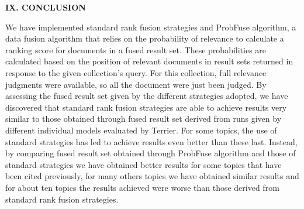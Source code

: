 \documentclass[12pt,journal]{IEEEtran}
\begin{document}
\textbf{IX.	CONCLUSION}

We have implemented standard rank fusion strategies and ProbFuse algorithm, a data fusion algorithm that relies on the probability of relevance to calculate a ranking score for documents in a fused result set.
These probabilities are calculated based on the position of relevant documents in result sets returned in response to the given collection’s query. For this collection, full relevance judgments were available, so all the document were just been judged. 
By assessing the fused result set given by the different strategies adopted, we have discovered that standard rank fusion strategies are able to achieve results very similar to those obtained through fused result set derived from runs given by different individual models evaluated by Terrier. For some topics, the use of standard strategies has led to achieve results even better than these last. Instead, by comparing fused result set obtained through ProbFuse algorithm and those of standard strategies we have obtained better results for some topics that have been cited previously, for many others topics we have obtained similar results and for about ten topics the results achieved were worse than those derived from standard rank fusion strategies.

\end{document}
